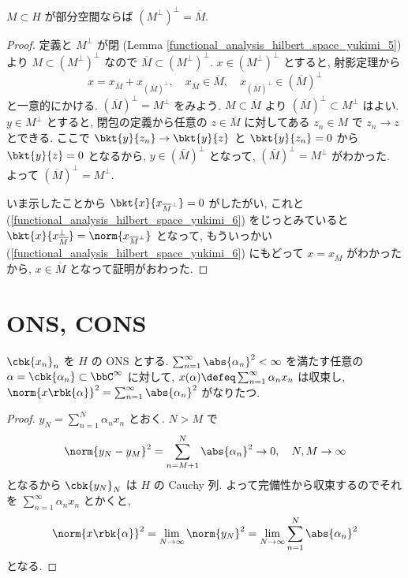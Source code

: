 \documentclass[openany, a4paper, oneside]{jsbook}
\begin{document}
\begin{prop}\label{functional_analysis_hilbert_space_yukimi_13}
 $M \subset H$ が部分空間ならば $(M^{\perp})^{\perp} = \overline{M}$.
\end{prop}
\begin{proof}
定義と $M^{\perp}$ が閉 (Lemma \ref{functional_analysis_hilbert_space_yukimi_5}) より
$M \subset (M^\perp)^\perp$ なので $\overline{M} \subset (M^\perp)^\perp$.
$x \in (M^\perp)^\perp$ とすると, 射影定理から
\begin{equation}
 x
 =
 x_{\overline{M}} + x_{(\overline{M})^\perp}, \quad
 x_{\overline{M}}\in \overline{M}, \quad
 x_{(\overline{M})^\perp} \in (\overline{M})^\perp \label{functional_analysis_hilbert_space_yukimi_6}
\end{equation}
と一意的にかける.
$(\overline{M})^\perp = M^\perp$ をみよう.
$M \subset \overline{M}$ より $(\overline{M})^\perp \subset M^\perp$ はよい.
$y \in M^\perp$ とすると, 閉包の定義から任意の $z \in \overline{M}$ に対してある
$z_{n} \in M$ で $z_{n} \to z$ とできる.
ここで $\bkt{y}{z_n} \to \bkt{y}{z}$ と $\bkt{y}{z_n} = 0$ から $\bkt{y}{z} = 0$ となるから,
$y \in (\overline{M})^\perp$ となって, $(\overline{M})^\perp = M^\perp$ がわかった.
よって $(\overline{M})^\perp = M^\perp$.

いま示したことから $\bkt{x}{x_{\overline{M}^{\perp}}} = 0$ がしたがい, これと (\ref{functional_analysis_hilbert_space_yukimi_6})
をじっとみていると $\bkt{x}{x_{\overline{M}}^{\perp}} = \norm{x_{\overline{M}^{\perp}}}$ となって,
もういっかい (\ref{functional_analysis_hilbert_space_yukimi_6}) にもどって
$x = x_{\overline{M}}$ がわかったから, $x \in \overline{M}$ となって証明がおわった.
\end{proof}
\section{ONS, CONS}

\begin{lem}\label{functional_analysis_hilbert_space_yukimi_7}
 $\cbk{x_{n}}_{n}$ を $H$ の ONS とする.
 $\sum_{n = 1}^\infty \abs{\alpha_{n}}^2 < \infty$ を満たす任意の
 $\alpha = \cbk{\alpha_{n}} \subset \bbC^{\infty}$ に対して,
 $x (\alpha) \defeq \sum_{n = 1}^\infty \alpha_{n}x_{n}$ は収束し,
 $\norm{x \rbk{\alpha}}^2 = \sum_{n=1}^\infty \abs{\alpha_{n}}^2$ がなりたつ.
\end{lem}
\begin{proof}
$y_{N} = \sum_{n=1}^N \alpha_{n} x_{n}$ とおく.
$N > M$ で
\begin{align}
 \norm{y_N - y_M}^2
 =
 \sum_{n = M+1}^N \abs{\alpha_n}^2
 \to 0, \quad N, M \to \infty
\end{align}
となるから $\cbk{y_N}_N$ は $H$ の Cauchy 列.
よって完備性から収束するのでそれを $\sum_{n=1}^\infty \alpha_n x_n$ とかくと,
\begin{align}
 \norm{x \rbk{\alpha}}^2
 =
 \lim_{N \to \infty} \norm{y_N}^2
 =
 \lim_{N \to \infty} \sum_{n=1}^N \abs{\alpha_{n}}^2
\end{align}
となる.
\end{proof}
\end{document}
